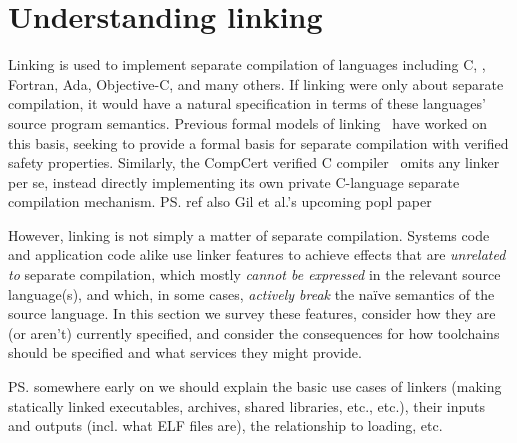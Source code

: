 \section{Understanding linking}

Linking is used to implement separate compilation 
of languages including C, \Cplusplus{}, Fortran, Ada, Objective-C, and
many others.
If linking were only about separate compilation, it would have a natural specification
in terms of these languages' source program semantics.
Previous formal models of linking~\cite{cardelli-program-1997, glew-type-safe-1999}
have worked on this basis, 
seeking to provide a formal basis for separate compilation with verified safety properties.
Similarly, the CompCert verified C compiler~\cite{leroy-formal-2009} 
omits any linker per se, instead 
directly implementing its own private C-language separate compilation mechanism.
\ps{ref also Gil et al.'s upcoming popl paper}

However, linking is not simply a matter of separate compilation.
Systems code and application code alike 
use linker features to achieve effects that are \emph{unrelated to} separate compilation,
which mostly \emph{cannot be expressed} in the relevant source language(s), 
and which, in some cases, \emph{actively break} the na\"ive semantics of the source language.
In this section we survey these features,
consider how they are (or aren't) currently specified, 
and consider the consequences for 
how toolchains should be specified and what services they might provide.

% 
% 
% 


\ps{somewhere early on we should explain the basic use cases of
  linkers (making statically linked executables, archives, shared
  libraries, etc., etc.), their inputs and outputs (incl. what ELF
  files are), the relationship
  to loading, etc.}

